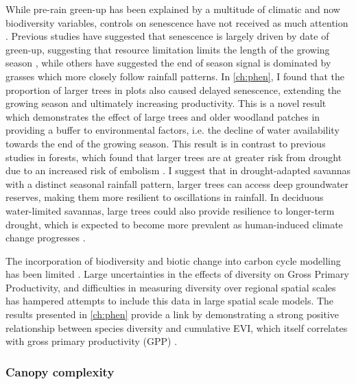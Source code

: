\begin{refsection}
While pre-rain green-up has been explained by a multitude of climatic and now biodiversity variables, controls on senescence have not received as much attention \citep{Gallinat2015}. Previous studies have suggested that senescence is largely driven by date of green-up, suggesting that resource limitation limits the length of the growing season \citep{Zani2020}, while others have suggested the end of season signal is dominated by grasses which more closely follow rainfall patterns. In \autoref{ch:phen}, I found that the proportion of larger trees in plots also caused delayed senescence, extending the growing season and ultimately increasing productivity. This is a novel result which demonstrates the effect of large trees and older woodland patches in providing a buffer to environmental factors, i.e. the decline of water availability towards the end of the growing season. This result is in contrast to previous studies in forests, which found that larger trees are at greater risk from drought due to an increased risk of embolism \citep{Bennett2015}. I suggest that in drought-adapted savannas with a distinct seasonal rainfall pattern, larger trees can access deep groundwater reserves, making them more resilient to oscillations in rainfall. In deciduous water-limited savannas, large trees could also provide resilience to longer-term drought, which is expected to become more prevalent as human-induced climate change progresses \citep{Kusangaya2014}. 

The incorporation of biodiversity and biotic change into carbon cycle modelling has been limited \citep{Ahlstrom2015, Bodegom2011}. Large uncertainties in the effects of diversity on Gross Primary Productivity, and difficulties in measuring diversity over regional spatial scales has hampered attempts to include this data in large spatial scale models. The results presented in \autoref{ch:phen} provide a link by demonstrating a strong positive relationship between species diversity and cumulative EVI, which itself correlates with gross primary productivity (GPP) \citep{Sjostrom2011}.

\subsubsection{Canopy complexity}
\label{discussion:sssec:canopy}


\end{refsection}
